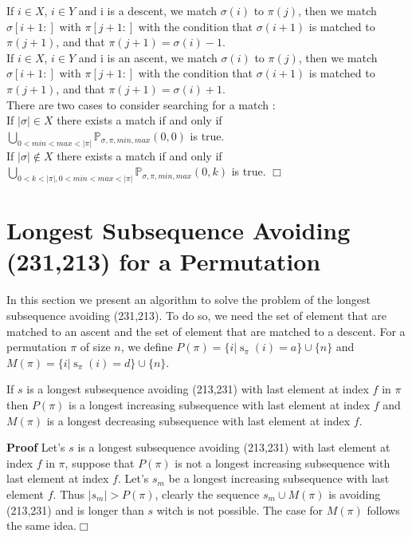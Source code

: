 \documentclass[a4paper]{llncs}
\newcommand{\ptext}{\pi}
\newcommand{\pmotif}{\sigma}
\newcommand{\x}{X}
\newcommand{\y}{Y}
\DeclareMathOperator{\stripea}{s}
\newcommand{\stripe}[2]{\stripea_{{#1}}({#2})}
\newcommand{\dstep}{d}
\newcommand{\ustep}{a}
\begin{document}
			If $i \in \x$, $i \in \y$ and i is a descent,
			we match $\pmotif(i)$ to $\ptext(j)$, 
			then we match $\pmotif[i+1:]$ with $\ptext[j+1:]$
			with the condition that
			$\pmotif(i+1)$ is matched to $\ptext(j+1)$,
			and that $\ptext(j+1)=\pmotif(i)-1$.\\			

			If $i \in \x$, $i \in \y$ and i is an ascent,
			we match $\pmotif(i)$ to $\ptext(j)$, 
			then we match $\pmotif[i+1:]$ with $\ptext[j+1:]$
			with the condition that
			$\pmotif(i+1)$ is matched to $\ptext(j+1)$,
			and that $\ptext(j+1)=\pmotif(i)+1$.\\		
					
			There are two cases to consider searching for a match : \\
			If $|\pmotif| \in \x$ there exists a match
			if and only if\\ $\bigcup_{0<min<max<|\ptext|}\mathbb{P}_{\pmotif,\ptext,min,max}(0,0)$ is true.\\
			
			If $|\pmotif| \notin \x$ there exists a match if and only if \\	$\bigcup_{0<k<|\ptext|,0<min<max<|\ptext|}\mathbb{P}_{\pmotif,\ptext,min,max}(0,k)$
			is true. $\Box$  			
	
	\section{Longest Subsequence Avoiding \\(231,213) for a Permutation}

	In this section we present an algorithm to solve the problem
	of the longest subsequence avoiding (231,213).
	To do so, we need the set of element
	that are matched to an ascent and the
	set of element that are matched to a descent.
	For a permutation $\pi$ of size $n$, we define
	$P(\pi) = \{i | \stripe{\pi}{i} = \ustep \} \cup \{n\}$ and  
	$M(\pi) = \{i | \stripe{\pi}{i} = \dstep \} \cup \{n\}$.\\
	
	\begin{proposition}
	\label{proposition:longestIncreasingSubsequence}
	If $s$ is a longest subsequence avoiding (213,231) with last element at index $f$ in $\pi$ then
	$P(\pi)$ is a longest increasing subsequence with last element at index $f$ and
	$M(\pi)$ is a longest decreasing subsequence with last element at index $f$.	
	\end{proposition}
	
	\textbf{Proof} Let's $s$ is a longest subsequence avoiding (213,231) with last element at index $f$ in $\pi$, 
	suppose that $P(\pi)$ is not a longest increasing subsequence with last element at index $f$. Let's $s_m$ be a longest increasing subsequence with last element $f$.
	Thus $|s_m|>P(\pi)$, clearly the sequence $s_m \cup M(\pi)$
	is avoiding (213,231) and is longer than $s$ witch is not possible. 
	The case for $M(\pi)$ follows the same idea.$\Box$\\
\end{document}
